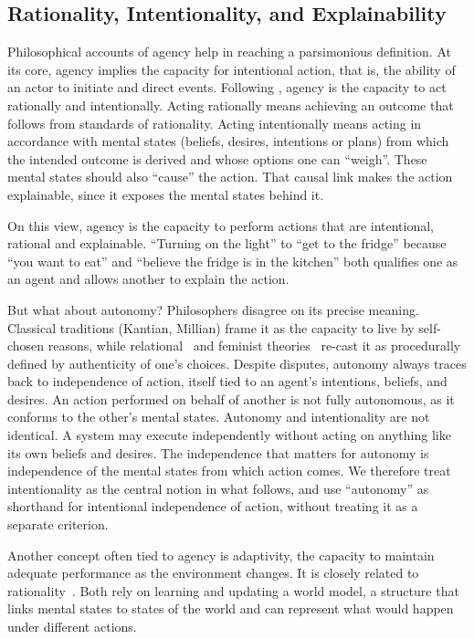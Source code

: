 \documentclass[pdflatex,sn-apa]{sn-jnl}%
\theoremstyle{definition}
\begin{document}
\subsection{Rationality, Intentionality, and Explainability}

Philosophical accounts of agency help in reaching a parsimonious definition. At its core, agency implies the capacity for intentional action, that is, the ability of an actor to initiate and direct events. Following \citet{davidsonEssaysActionsEvents1980}, agency is the capacity to act rationally and intentionally. Acting rationally means achieving an outcome that follows from standards of rationality. Acting intentionally means acting in accordance with mental states (beliefs, desires, intentions or plans) from which the intended outcome is derived and whose options one can ``weigh''. These mental states should also ``cause'' the action. That causal link makes the action explainable, since it exposes the mental states behind it.

On this view, agency is the capacity to perform actions that are intentional, rational and explainable. ``Turning on the light'' to ``get to the fridge'' because ``you want to eat'' and ``believe the fridge is in the kitchen'' both qualifies one as an agent and allows another to explain the action.

But what about autonomy? Philosophers disagree on its precise meaning. Classical traditions (Kantian, Millian) frame it as the capacity to live by self-chosen reasons, while relational~\citep{oshanaRelationalAutonomy2020} and feminist theories~\citep{mackenzieFeministConceptionsAutonomy2017} re-cast it as procedurally defined by authenticity of one's choices. Despite disputes, autonomy always traces back to independence of action, itself tied to an agent's intentions, beliefs, and desires. An action performed on behalf of another is not fully autonomous, as it conforms to the other's mental states. Autonomy and intentionality are not identical. A system may execute independently without acting on anything like its own beliefs and desires. The independence that matters for autonomy is independence of the mental states from which action comes. We therefore treat intentionality as the central notion in what follows, and use ``autonomy'' as shorthand for intentional independence of action, without treating it as a separate criterion.

Another concept often tied to agency is adaptivity, the capacity to maintain adequate performance as the environment changes. It is closely related to rationality~\citep{shavitPracticesGoverningAgentic}. Both rely on learning and updating a world model, a structure that links mental states to states of the world and can represent what would happen under different actions.
\end{document}
